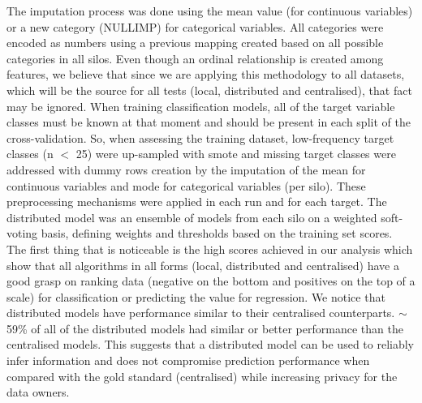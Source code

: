 


The imputation process was done using the mean value (for continuous variables) or a new category (NULLIMP) for categorical variables. All categories were encoded as numbers using a previous mapping created based on all possible categories in all silos. Even though an ordinal relationship is created among features, we believe that since we are applying this methodology to all datasets, which will be the source for all tests (local, distributed and centralised), that fact may be ignored.
When training classification models, all of the target variable classes must be known at that moment and should be present in each split of the cross-validation. So, when assessing the training dataset, low-frequency target classes (n $<$ 25) were up-sampled with \ac{smote} \cite{smote} and missing target classes were addressed with dummy rows creation by the imputation of the mean for continuous variables and mode for categorical variables (per silo). These preprocessing mechanisms were applied in each run and for each target.
The distributed model was an ensemble of models from each silo on a weighted soft-voting basis, defining weights and thresholds based on the training set scores. 
The first thing that is noticeable is the high scores achieved in our analysis which show that all algorithms in all forms (local, distributed and centralised) have a good grasp on ranking data (negative on the bottom and positives on the top of a scale) for classification or predicting the value for regression. We notice that distributed models have performance similar to their centralised counterparts. $\sim$59\% of all of the distributed models had similar or better performance than the centralised models. This suggests that a distributed model can be used to reliably infer information and does not compromise prediction performance when compared with the gold standard (centralised) while increasing privacy for the data owners.\\

